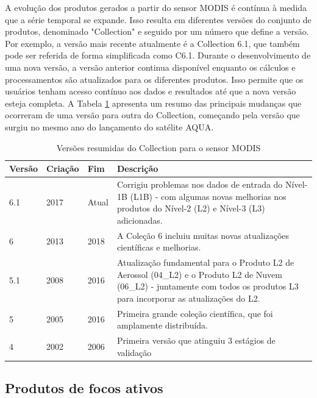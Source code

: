\documentclass[cic,tc]{iiufrgs}
\begin{document}
A evolução dos produtos gerados a partir do sensor MODIS é contínua à medida que a série temporal se expande. Isso resulta em diferentes versões do conjunto de produtos, denominado "Collection" e seguido por um número que define a versão. Por exemplo, a versão mais recente atualmente é a Collection 6.1, que também pode ser referida de forma simplificada como C6.1. Durante o desenvolvimento de uma nova versão, a versão anterior continua disponível enquanto os cálculos e processamentos são atualizados para os diferentes produtos. Isso permite que os usuários tenham acesso contínuo aos dados e resultados até que a nova versão esteja completa. A Tabela \ref{table:versoes_collection} apresenta um resumo das principais mudanças que ocorreram de uma versão para outra do Collection, começando pela versão que surgiu no mesmo ano do lançamento do satélite AQUA.

\begin{table}[htbp]
\centering
\caption{Versões resumidas do Collection para o sensor MODIS}
\begin{tabular}{ @{}lllp{10cm}@{} }
  \toprule
  Versão & Criação & Fim & Descrição \\
  \midrule
  6.1 & 2017 & Atual & Corrigiu problemas nos dados de entrada do Nível-1B (L1B) - com algumas novas melhorias nos produtos do Nível-2 (L2) e Nível-3 (L3) adicionadas. \\
  6   & 2013 & 2018  & A Coleção 6 incluiu muitas novas atualizações científicas e melhorias. \\
  5.1 & 2008 & 2016  & Atualização fundamental para o Produto L2 de Aerossol (04\_L2) e o Produto L2 de Nuvem (06\_L2) - juntamente com todos os produtos L3 para incorporar as atualizações do L2. \\
  5   & 2005 & 2016  & Primeira grande coleção científica, que foi amplamente distribuída. \\
  4   & 2002 & 2006  & Primeira versão que atinguiu 3 estágios de validação \\
  \bottomrule
\end{tabular}
\label{table:versoes_collection}
\end{table}

\subsection*{Produtos de focos ativos}
\end{document}
